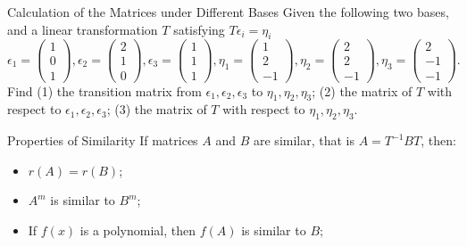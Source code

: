 \begin{example}{Calculation of the Matrices under Different Bases}{}
  Given the following two bases, and a linear transformation $T$ satisfying
  $T\epsilon_i = \eta_i$
  \begin{equation}
    \epsilon_1 =
    \begin{pmatrix}
      1\\ 0 \\ 1
    \end{pmatrix},
    \epsilon_2 =
    \begin{pmatrix}
      2\\ 1 \\ 0
    \end{pmatrix},
    \epsilon_3 =
    \begin{pmatrix}
      1\\ 1 \\ 1
    \end{pmatrix},
    \eta_1 =
    \begin{pmatrix}
      1\\ 2 \\ -1
    \end{pmatrix},
    \eta_2 =
    \begin{pmatrix}
      2\\ 2 \\ -1
    \end{pmatrix},
    \eta_3 =
    \begin{pmatrix}
      2\\ -1 \\ -1
    \end{pmatrix}.
  \end{equation}
  Find
  (1) the transition matrix from $\epsilon_1, \epsilon_2, \epsilon_3$ to
  $\eta_1, \eta_2, \eta_3$;
  (2) the matrix of $T$ with respect to $\epsilon_1, \epsilon_2, \epsilon_3$;
  (3) the matrix of $T$ with respect to $\eta_1, \eta_2, \eta_3$.
\end{example}

\begin{solution}
  
\end{solution}

\begin{proposition}{Properties of Similarity}{}
  If matrices $A$ and $B$ are similar, that is $A = T^{-1}BT$,
  then:
  \begin{itemize}
  \item $r(A) = r(B)$;
  \item $A^m$ is similar to $B^{m}$;
  \item If $f(x)$ is a polynomial, then $f(A)$ is similar to $B$;
  \end{itemize}
\end{proposition}


